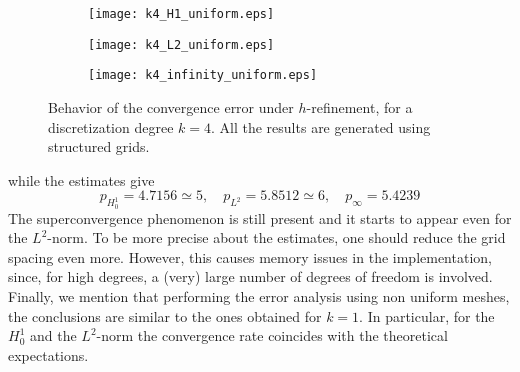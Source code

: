\documentclass[10pt]{article}
\begin{document}
\begin{figure}[H]
	\centering
	\begin{subfigure}{0.32\textwidth}
		\centering
		\texttt{[image: k4\_H1\_uniform.eps]}
		\label{fig:k4_H1_uniform}
	\end{subfigure}
	\begin{subfigure}{0.32\textwidth}
		\centering
		\texttt{[image: k4\_L2\_uniform.eps]}
		\label{fig:k4_L2_uniform}
	\end{subfigure}
	\begin{subfigure}{0.32\textwidth}
		\centering
		\texttt{[image: k4\_infinity\_uniform.eps]}
		\label{fig:k4_infinity_uniform}
	\end{subfigure}
	\caption{Behavior of the convergence error under $h$-refinement, for a discretization degree $k=4$. All the results are generated using structured grids.}
	\label{fig:k4_uniform}
\end{figure}
while the estimates give
$$p_{H^1_0}=4.7156\simeq5, \quad p_{L^2}=5.8512\simeq6, \quad p_\infty=5.4239$$
The superconvergence phenomenon is still present and it starts to appear even for the $L^2$-norm. To be more precise about the estimates, one should reduce the grid spacing even more. However, this causes memory issues in the implementation, since, for high degrees, a (very) large number of degrees of freedom is involved. \\
Finally, we mention that performing the error analysis using non uniform meshes, the conclusions are similar to the ones obtained for $k=1$. In particular, for the $H_0^1$ and the $L^2$-norm the convergence rate coincides 
with the theoretical expectations.
\end{document}
